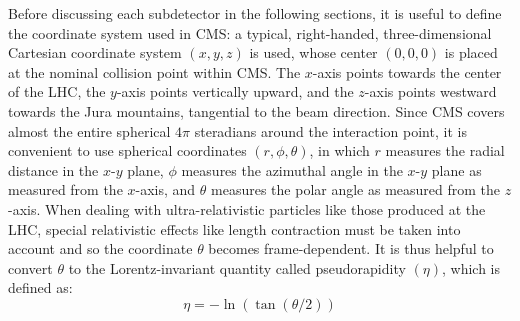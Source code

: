Before discussing each subdetector in the following sections, it is useful to define the coordinate system used in CMS:
a typical, right-handed, three-dimensional Cartesian coordinate system $(x, y, z)$ is used, whose center $(0, 0, 0)$ is placed at the nominal \pp collision point within CMS.
The $x$-axis points towards the center of the LHC, the $y$-axis points vertically upward, and the $z$-axis points westward towards the Jura mountains, tangential to the beam direction.
Since CMS covers almost the entire spherical $4\pi$ steradians around the interaction point, it is convenient to use spherical coordinates $(r, \phi, \theta)$,
in which $r$ measures the radial distance in the $x$-$y$ plane, $\phi$ measures the azimuthal angle in the $x$-$y$ plane as measured from the $x$-axis, and $\theta$ measures the polar angle as measured from the $z$-axis.
When dealing with ultra-relativistic particles like those produced at the LHC, special relativistic effects like length contraction must be taken into account and so the coordinate $\theta$ becomes frame-dependent.
It is thus helpful to convert $\theta$ to  the Lorentz-invariant quantity called pseudorapidity $(\eta)$, which is defined as:
\begin{equation*}
    \eta = -\ln \left(
        \tan (\theta / 2)
        \right)
\end{equation*}
